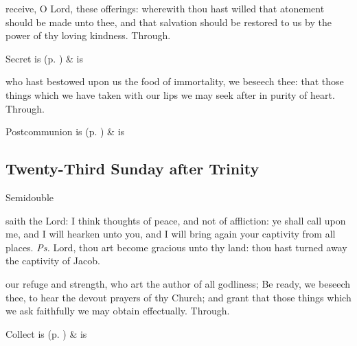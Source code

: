 

\secret
{} receive, O Lord, these offerings: wherewith thou hast willed that atonement should be made unto thee, and that salvation should be restored to us by the power of thy loving kindness. Through.
\begin{rubric}
     Secret is  (p. \pageref{SPSaints}) \&  is 
\end{rubric}


\clearpage
\postcommunion
{} who hast bestowed upon us the food of immortality, we beseech thee: that those things which we have taken with our lips we may seek after in purity of heart. Through.
\begin{rubric}
     Postcommunion is  (p. \pageref{SPSaints}) \&  is 
\end{rubric}


\subsection{Twenty-Third Sunday after Trinity}
\begin{inhead}
{Semidouble}
\end{inhead}


\introit
{} saith the Lord: I think thoughts of peace, and not of affliction: ye shall call upon me, and I will hearken unto you, and I will bring again your captivity from all places. \textit{Ps.} Lord, thou art become gracious unto thy land: thou hast turned away the captivity of Jacob.

\collect
{} our refuge and strength, who art the author of all godliness; Be ready, we beseech thee, to hear the devout prayers of thy Church; and grant that those things which we ask faithfully we may obtain effectually. Through.
\begin{rubric}
     Collect is  (p. \pageref{SPSaints}) \&  is 
\end{rubric}


